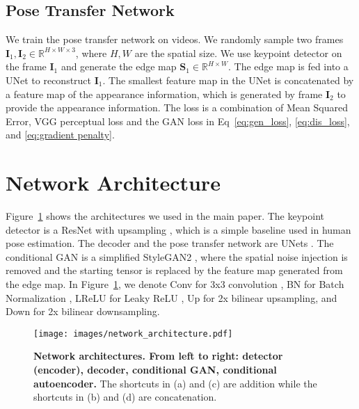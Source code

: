 \documentclass{article}
\newcommand{\R}{\mathbb{R}}
\newcommand{\mI}{\mathbf{I}}
\newcommand{\mS}{\mathbf{S}}
\begin{document}
\subsection{Pose Transfer Network}
We train the pose transfer network on videos. We randomly sample two frames $\mI_1, \mI_2\in\R^{H\times W\times 3}$, where $H,W$ are the spatial size. We use keypoint detector on the frame $\mI_1$ and generate the edge map $\mS_1\in\R^{H\times W}$. The edge map is fed into a UNet \cite{ronneberger2015u} to reconstruct $\mI_1$. The smallest feature map in the UNet is concatenated by a feature map of the appearance information, which is generated by frame $\mI_2$ to provide the appearance information. The loss is a combination of Mean Squared Error, VGG perceptual loss \cite{johnson2016perceptual} and the GAN loss in Eq~\ref{eq:gen_loss}, \ref{eq:dis_loss}, and \ref{eq:gradient penalty}.

\section{Network Architecture} \label{supp:archi}
Figure~\ref{fig:net_archi} shows the architectures we used in the main paper. 
The keypoint detector is a ResNet with upsampling \cite{xiao2018simple}, which is a simple baseline used in human pose estimation.
The decoder and the pose transfer network are UNets \cite{ronneberger2015u}.
The conditional GAN is a simplified StyleGAN2 \cite{karras2020analyzing}, where the spatial noise injection is removed and the starting tensor is replaced by the feature map generated from the edge map.
In Figure~\ref{fig:net_archi}, we denote Conv for 3x3 convolution \cite{lecun1989backpropagation}, BN for Batch Normalization \cite{ioffe2015batch}, LReLU for Leaky ReLU \cite{maas2013rectifier}, Up for 2x bilinear upsampling, and Down for 2x bilinear downsampling. 

\begin{figure}[t]
\begin{center}
  \texttt{[image: images/network\_architecture.pdf]}
\end{center}
    \caption{\textbf{Network architectures. From left to right: detector (encoder), decoder, conditional GAN, conditional autoencoder.}
    The shortcuts in (a) and (c) are addition while the shortcuts in (b) and (d) are concatenation.
}
\label{fig:net_archi}
\end{figure}
\end{document}
